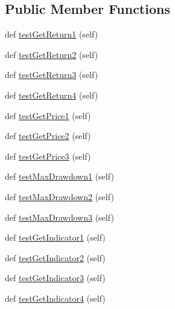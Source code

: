 \subsection*{Public Member Functions}
\begin{DoxyCompactItemize}
\item 
def \hyperlink{classtest_1_1testdataprocessor_1_1TestDataProcessor_a6d0060026bc4963bf58c0fc502c1f647}{test\+Get\+Return1} (self)
\item 
def \hyperlink{classtest_1_1testdataprocessor_1_1TestDataProcessor_aa0451dcab76c90b2824fbc91c3f4bee0}{test\+Get\+Return2} (self)
\item 
def \hyperlink{classtest_1_1testdataprocessor_1_1TestDataProcessor_a6e171daffdd0608e5334d54795c20626}{test\+Get\+Return3} (self)
\item 
def \hyperlink{classtest_1_1testdataprocessor_1_1TestDataProcessor_af36dc7d2d905933ac59691b4609b74ce}{test\+Get\+Return4} (self)
\item 
def \hyperlink{classtest_1_1testdataprocessor_1_1TestDataProcessor_a5e277ac5b340c6bb491eff36a6000f56}{test\+Get\+Price1} (self)
\item 
def \hyperlink{classtest_1_1testdataprocessor_1_1TestDataProcessor_a2d042b3c50d860ddf2806be50318b6e3}{test\+Get\+Price2} (self)
\item 
def \hyperlink{classtest_1_1testdataprocessor_1_1TestDataProcessor_abea988851e0da77192e4048897006725}{test\+Get\+Price3} (self)
\item 
def \hyperlink{classtest_1_1testdataprocessor_1_1TestDataProcessor_a5b7943d1183bcd306163d4e50a469854}{test\+Max\+Drawdown1} (self)
\item 
def \hyperlink{classtest_1_1testdataprocessor_1_1TestDataProcessor_aca7fcd5ebc68735c66bdaf7ac498287a}{test\+Max\+Drawdown2} (self)
\item 
def \hyperlink{classtest_1_1testdataprocessor_1_1TestDataProcessor_a53255217d9105331fbd84eb51a7584e3}{test\+Max\+Drawdown3} (self)
\item 
def \hyperlink{classtest_1_1testdataprocessor_1_1TestDataProcessor_a8eb1635599669ec61f398acdef228665}{test\+Get\+Indicator1} (self)
\item 
def \hyperlink{classtest_1_1testdataprocessor_1_1TestDataProcessor_af49bbac371e28db7d98504e7ede06cca}{test\+Get\+Indicator2} (self)
\item 
def \hyperlink{classtest_1_1testdataprocessor_1_1TestDataProcessor_a8242e4dd97143e992bf624038265de2f}{test\+Get\+Indicator3} (self)
\item 
def \hyperlink{classtest_1_1testdataprocessor_1_1TestDataProcessor_a47dce81eea21d9be9b356d3a01009a00}{test\+Get\+Indicator4} (self)
\end{DoxyCompactItemize}


